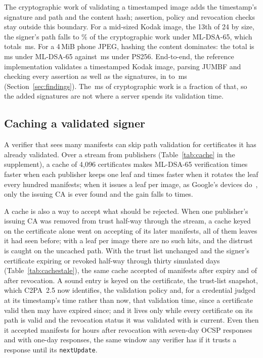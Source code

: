 The cryptographic work of validating a timestamped image adds the timestamp's
signature and path and the content hash; assertion, policy and revocation
checks stay outside this boundary. For a mid-sized Kodak image, the 13th of 24 by
size, the signer's path falls to \NvPathShareDSAsixtyfive\% of the
cryptographic work under ML-DSA-65, which totals \NvCompleteDSAsixtyfive\,ms.
For a 4\,MiB phone JPEG, hashing the content dominates: the total is
\NvCompletePhoneDSAsixtyfive\,ms under ML-DSA-65 against
\NvCompletePhonePS\,ms under PS256. End-to-end, the reference implementation
validates a timestamped Kodak image, parsing JUMBF and checking every assertion
as well as the signatures, in \NvalVerifyLo{} to \NvalVerifyHi\,ms
(Section~\ref{sec:findings}). The \NvCompleteDSAsixtyfive\,ms of
cryptographic work is a fraction of that, so the added signatures are not where
a server spends its validation time.

\subsection{Caching a validated signer}
\label{sec:cache}

A verifier that sees many manifests can skip path validation for certificates
it has already validated. Over a stream from \Ncachepublishers{} publishers
(Table~\ref{tab:cache} in the supplement), a cache of 4,096 certificates makes
ML-DSA-65 verification \NcacheLongDSAsixtyfive{} times faster when each
publisher keeps one leaf and \NcacheRotDSAsixtyfive{} times faster when it
rotates the leaf every hundred manifests; when it issues a leaf per image, as
Google's devices do~\cite{google2025pixel}, only the issuing CA is ever found
and the gain falls to \NcachePerDSAsixtyfive{} times.

A cache is also a way to accept what should be rejected. When one publisher's
issuing CA was removed from trust half-way through the stream, a cache keyed
on the certificate alone went on accepting \NnaiveLongDSAsixtyfive{} of its
\NnaiveTotLongDSAsixtyfive{} later manifests, all of them leaves it had seen
before; with a leaf per image there are no such hits, and the distrust is
caught on the uncached path. With the trust list unchanged and
the signer's certificate expiring or revoked half-way through thirty simulated
days (Table~\ref{tab:cachestale}), the same cache accepted \NstaleExpNaive{}
of \NstaleExpTot{} manifests after expiry and \NstaleRevNaive{} of
\NstaleRevTot{} after revocation. A sound entry is keyed on the certificate,
the trust-list snapshot, which C2PA~2.5 now identifies, the validation policy
and, for a credential judged at its timestamp's time rather than now, that
validation time, since a certificate valid then may have expired since; and it
lives only while every certificate on its path is valid and the
revocation status it was validated with is current. Even then it accepted
manifests for \NstaleRevBoundSevenH{} hours after revocation with seven-day
OCSP responses and \NstaleRevBoundOneH{} with one-day responses, the same
window any verifier has if it trusts a response until its
\texttt{nextUpdate}.

